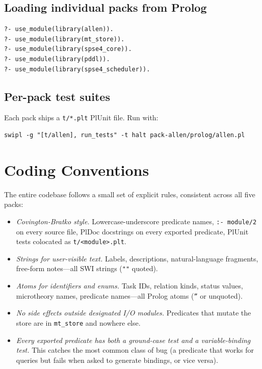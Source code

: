 \documentclass[11pt,letterpaper]{article}
\begin{document}
\subsection{Loading individual packs from Prolog}

\begin{lstlisting}
?- use_module(library(allen)).
?- use_module(library(mt_store)).
?- use_module(library(spse4_core)).
?- use_module(library(pddl)).
?- use_module(library(spse4_scheduler)).
\end{lstlisting}

\subsection{Per-pack test suites}

Each pack ships a \texttt{t/*.plt} PlUnit file. Run with:

\begin{lstlisting}
swipl -g "[t/allen], run_tests" -t halt pack-allen/prolog/allen.pl
\end{lstlisting}

\section{Coding Conventions}

The entire codebase follows a small set of explicit rules, consistent
across all five packs:

\begin{itemize}
\item \emph{Covington-Bratko style.} Lowercase-underscore predicate names,
  \texttt{:- module/2} on every source file, PlDoc docstrings on every
  exported predicate, PlUnit tests colocated as \texttt{t/<module>.plt}.
\item \emph{Strings for user-visible text.} Labels, descriptions,
  natural-language fragments, free-form notes---all SWI strings
  (\texttt{""} quoted).
\item \emph{Atoms for identifiers and enums.} Task IDs, relation kinds,
  status values, microtheory names, predicate names---all Prolog atoms
  (\texttt{''} or unquoted).
\item \emph{No side effects outside designated I/O modules.} Predicates
  that mutate the store are in \texttt{mt\_store} and nowhere else.
\item \emph{Every exported predicate has both a ground-case test and a
  variable-binding test.} This catches the most common class of bug (a
  predicate that works for queries but fails when asked to generate
  bindings, or vice versa).
\end{itemize}
\end{document}

